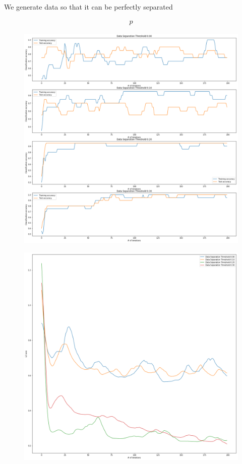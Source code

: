 \documentclass[main.tex]{subfiles}
\begin{document}
We generate data so that it can be perfectly separated 

\begin{align*}
p	
\end{align*}

\begin{figure}
\includegraphics[width=\textwidth]{images/data_sep}
\end{figure}

\begin{figure}
\includegraphics[width=\textwidth]{images/l2_loss_conv}	
\end{figure}
\end{document}

